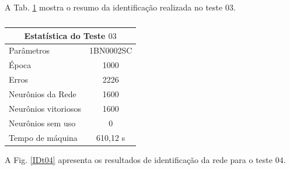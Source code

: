 A Tab. \ref{Estatistica do teste $03$} mostra o resumo da identificação realizada no teste $03$.

\begin{table}[H]
	\centering
	\caption{}
	\label{Estatistica do teste $03$}
	\begin{tabular}{@{}lc@{}}
		\toprule
		\multicolumn{2}{c}{Estatística do Teste $03$}         \\ \midrule
		Parâmetros                  & 1BN0002SC \\
		Época                       & 1000       \\
		Erros                       & 2226       \\
		Neurônios da Rede           & 1600       \\
		Neurônios vitoriosos        & 1600       \\
		Neurônios sem uso           & 0         \\
		Tempo de máquina            & 610,12 s   \\ \bottomrule
	\end{tabular}
\end{table} 

A Fig. \ref{IDt04} apresenta os resultados de identificação da rede para o teste $04$.

